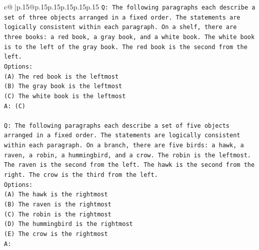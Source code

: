 \documentclass{article}
\begin{document}
{\begin{supertabular}{c@{$\;$}|p{.15\linewidth}@{}p{.15\linewidth}p{.15\linewidth}p{.15\linewidth}p{.15\linewidth}p{.15\linewidth}}
{{{\texttt{Q: The following paragraphs each describe a set of three objects arranged in a fixed order. The statements are logically consistent within each paragraph. On a shelf, there are three books: a red book, a gray book, and a white book. The white book is to the left of the gray book. The red book is the second from the left.} \\
\texttt{Options:} \\
\texttt{(A) The red book is the leftmost} \\
\texttt{(B) The gray book is the leftmost} \\
\texttt{(C) The white book is the leftmost} \\
\texttt{A: (C)} \\
\\ 
\texttt{Q: The following paragraphs each describe a set of five objects arranged in a fixed order. The statements are logically consistent within each paragraph. On a branch, there are five birds: a hawk, a raven, a robin, a hummingbird, and a crow. The robin is the leftmost. The raven is the second from the left. The hawk is the second from the right. The crow is the third from the left.} \\
\texttt{Options:} \\
\texttt{(A) The hawk is the rightmost} \\
\texttt{(B) The raven is the rightmost} \\
\texttt{(C) The robin is the rightmost} \\
\texttt{(D) The hummingbird is the rightmost} \\
\texttt{(E) The crow is the rightmost} \\
\texttt{A:} \\
            }
        }
    }
     \\ \\


\end{supertabular}}
\end{document}
